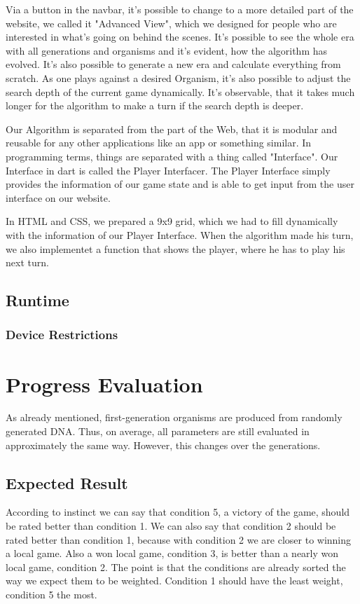 Via a button in the navbar, it's possible to change to a more detailed  part of the website, we called it "Advanced View", which we designed for people who are interested in what's going on behind the scenes. It's possible to see the whole era with all generations and organisms and it's evident, how the algorithm has evolved. It's also possible to generate a new era and calculate everything from scratch. As one plays against a desired Organism, it's also possible to adjust the search depth of the current game dynamically. It's observable, that it takes much longer for the algorithm to make a turn if the search depth is deeper. %

Our Algorithm is separated from the part of the Web, that it is modular and reusable for any other applications like an app or something similar. In programming terms, things are separated with a thing called "Interface". Our Interface in dart is called the Player Interfacer. The Player Interface simply provides the information of our game state and is able to get input from the user interface on our website.

In HTML and CSS, we prepared a 9x9 grid, which we had to fill dynamically with the information of our Player Interface. When the algorithm made his turn, we also implementet a function that shows the player, where he has to play his next turn. 


\subsection{ Runtime } 

\subsubsection{ Device Restrictions}


\section{Progress Evaluation}
As already mentioned, first-generation organisms are produced from randomly generated DNA. Thus, on average, all parameters are still evaluated in approximately the same way. However, this changes over the generations.

\subsection{Expected Result}
According to instinct we can say that condition 5, a victory of the game, should be rated better than condition 1. We can also say that condition 2 should be rated better than condition 1, because with condition 2 we are closer to winning a local game. Also a won local game, condition 3, is better than a nearly won local game, condition 2.
The point is that the conditions are already sorted the way we expect them to be weighted. Condition 1 should have the least weight, condition 5 the most.

